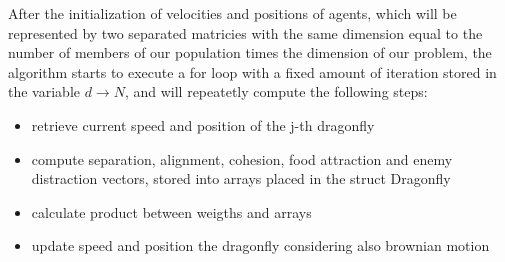 \documentclass[10pt]{article}
\begin{document}
\begin{multicols}{2}
After the initialization of velocities and positions of agents,
which will be represented by two separated matricies with the same dimension equal to the number of members of our
population times the dimension of our problem, the algorithm starts to execute a for loop with a fixed amount of iteration stored in the variable $d\rightarrow N$, 
and will repeatetly compute the following steps:
\begin{itemize}
  \item retrieve current speed and position of the j-th dragonfly
  \item compute separation, alignment, cohesion, food attraction and enemy distraction vectors,
  stored into arrays placed in the struct Dragonfly
  \item calculate product between weigths and arrays
  \item update speed and position the dragonfly considering also brownian motion
\end{itemize}

\end{multicols}
\end{document}
